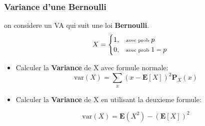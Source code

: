 \documentclass{beamer}
\renewcommand{\P}{\mathbf{P}}
\newcommand{\E}{\mathbf{E}}
\newcommand{\var}{\text{var}}
\begin{document}
\begin{frame}[t]
  \frametitle{Variance d'une Bernoulli}
  on considere un \ac{VA}  qui suit une loi \alert{\textbf{Bernoulli}}.
  \begin{equation*}
    X = \begin{cases}
       1, & \text{\scriptsize avec prob } p\\ 
       0, & \text{\scriptsize avec prob } 1-p
    \end{cases}
  \end{equation*}
 \pause 
  \begin{itemize}
    \item Calculer la \alert{\textbf{Variance}}  de X avec formule normale:
      \begin{equation*}
        \var(X) = \sum_x ( x - \E[X])^2\P_X(x)
      \end{equation*}
  \end{itemize}
  \vspace*{1cm}
  \begin{itemize}
    \item Calculer la \alert{\textbf{Variance}}  de X en utilisant la deuxieme
      formule:
    
      \begin{equation*}
        \var(X) = \E(X^2) - (\E[X])^2
      \end{equation*}
  \end{itemize}
\end{frame}
\end{document}
